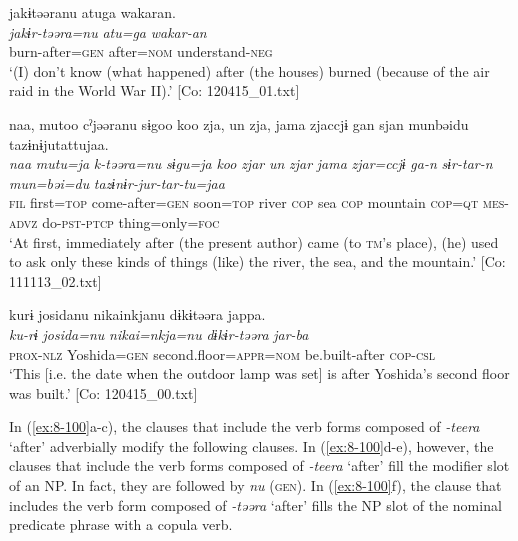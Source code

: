 \ex
{\TM}
\glll  jakɨtəəranu  atuga  wakaran.\\
\textit{jakɨr-təəra=nu}  \textit{atu=ga}  \textit{wakar-an}\\
burn-after=\textsc{gen}  after=\textsc{nom}  understand-\textsc{neg}\\
\glt ‘(I) don’t know (what happened) after (the houses) burned (because of the air raid in the World War II).’ [Co: 120415\_01.txt]


{\TM}
\glll  naa,  mutoo  cˀjəəranu  sɨgoo  koo  zja,  un  zja,      jama  zjaccjɨ  gan  sjan  munbəidu    tazɨnɨjutattujaa.\\
\textit{naa}  \textit{mutu=ja}  \textit{k-təəra=nu}  \textit{sɨgu=ja}  \textit{koo}  \textit{zjar}  \textit{un}  \textit{zjar}  \textit{jama}  \textit{zjar=ccjɨ}  \textit{ga-n}  \textit{sɨr-tar-n}  \textit{mun=bəi=du}  \textit{tazɨnɨr-jur-tar-tu=jaa}\\
\textsc{fil}  first=\textsc{top}  come-after=\textsc{gen}  soon=\textsc{top}  river  \textsc{cop}  sea  \textsc{cop}  mountain  \textsc{cop}=\textsc{qt}  \textsc{mes}-\textsc{advz}  do-\textsc{pst}-\textsc{ptcp}  thing=only=\textsc{foc}   \\
\glt ‘At first, immediately after (the present author) came (to \textsc{tm}’s place), (he) used to ask only these kinds of things (like) the river, the sea, and the mountain.’ [Co: 111113\_02.txt]

\ex
{\TM}
\glll  kurɨ  josidanu  {\textbar}nikai{\textbar}nkjanu  dɨkɨtəəra      jappa.\\
\textit{ku-rɨ}  \textit{josida=nu}  \textit{nikai=nkja=nu}  \textit{dɨkɨr-təəra}      \textit{jar-ba}\\
\textsc{prox}-\textsc{nlz}  Yoshida=\textsc{gen}  second.floor=\textsc{appr}=\textsc{nom}  be.built-after   \textsc{cop}-\textsc{csl}\\
\glt ‘This [i.e. the date when the outdoor lamp was set] is after Yoshida’s second floor was built.’ [Co: 120415\_00.txt]
\z
\z

In (\ref{ex:8-100}a-c), the clauses that include the verb forms composed of \textit{-teera} ‘after’ adverbially modify the following clauses. In (\ref{ex:8-100}d-e), however, the clauses that include the verb forms composed of \textit{-teera} ‘after’ fill the modifier slot of an NP. In fact, they are followed by \textit{nu} (\textsc{gen}). In (\ref{ex:8-100}f), the clause that includes the verb form composed of \textit{-təəra} ‘after’ fills the NP slot of the nominal predicate phrase with a copula verb.

